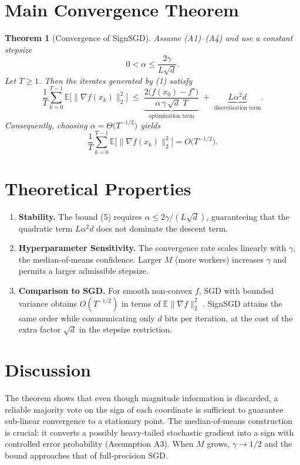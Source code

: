 \documentclass{article}
\newtheorem{theorem}{Theorem}
\newcommand{\E}{\mathbb{E}}
\begin{document}
\section*{Main Convergence Theorem}
\begin{theorem}[Convergence of SignSGD]\label{thm:main}
Assume (A1)–(A4) and use a constant stepsize  
\[
0<\alpha\le\frac{2\gamma}{L\sqrt{d}}.
\tag{4}
\]
Let $T\ge1$. Then the iterates generated by (1) satisfy
\[
\frac1T\sum_{k=0}^{T-1}\E\!\bigl[\|\nabla f(x_k)\|_{2}^{2}\bigr]
\;\le\;
\underbrace{\frac{2\bigl(f(x_0)-f^{\star}\bigr)}{\alpha\,\gamma\,\sqrt{d}\;T}}_{\text{optimization term}}
\;+\;
\underbrace{L\alpha^{2}d}_{\text{discretisation term}}.
\tag{5}
\]
Consequently, choosing $\alpha = \Theta\!\bigl(T^{-1/2}\bigr)$ yields
\[
\frac1T\sum_{k=0}^{T-1}\E\!\bigl[\|\nabla f(x_k)\|_{2}^{2}\bigr]=O\!\bigl(T^{-1/2}\bigr).
\]
\end{theorem}

\section*{Theoretical Properties}
\begin{enumerate}[label=(\roman*)]
\item \textbf{Stability.} The bound (5) requires $\alpha\le 2\gamma/(L\sqrt d)$, guaranteeing that the quadratic term $L\alpha^{2}d$ does not dominate the descent term.
\item \textbf{Hyperparameter Sensitivity.} The convergence rate scales linearly with $\gamma$, the median‑of‑means confidence. Larger $M$ (more workers) increases $\gamma$ and permits a larger admissible stepsize.
\item \textbf{Comparison to SGD.} For smooth non‑convex $f$, SGD with bounded variance obtains $O(T^{-1/2})$ in terms of $\E\|\nabla f\|_{2}^{2}$ \cite{ghadimi2013stochastic}. SignSGD attains the same order while communicating only $d$ bits per iteration, at the cost of the extra factor $\sqrt d$ in the stepsize restriction.
\end{enumerate}

\section*{Discussion}
The theorem shows that even though magnitude information is discarded, a reliable majority vote on the sign of each coordinate is sufficient to guarantee sub‑linear convergence to a stationary point. The median‑of‑means construction is crucial: it converts a possibly heavy‑tailed stochastic gradient into a sign with controlled error probability (Assumption A3). When $M$ grows, $\gamma\to 1/2$ and the bound approaches that of full‑precision SGD.
\end{document}
